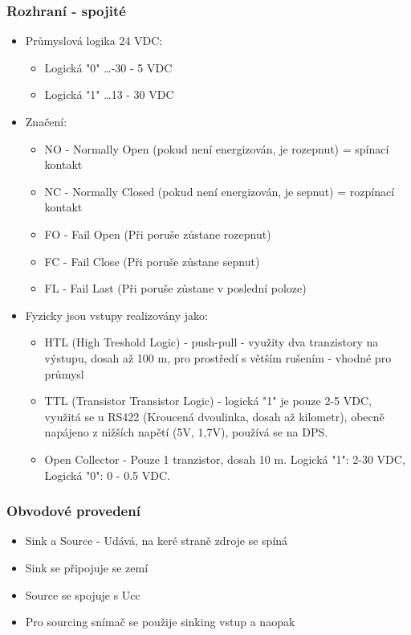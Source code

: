 \subsubsection*{Rozhraní - spojité}
\begin{itemize}
    \item Průmyslová logika 24 VDC: \begin{itemize}
              \item Logická "0" \dots -30 - 5 VDC
              \item Logická "1" \dots 13 - 30 VDC
          \end{itemize}
    \item Značení: \begin{itemize}
              \item NO - Normally Open (pokud není energizován, je rozepnut) = spínací kontakt
              \item NC - Normally Closed (pokud není energizován, je sepnut) = rozpínací kontakt
              \item FO - Fail Open (Při poruše zůstane rozepnut)
              \item FC - Fail Close (Při poruše zůstane sepnut)
              \item FL - Fail Last (Při poruše zůstane v poslední poloze)
          \end{itemize}
    \item Fyzicky jsou vstupy realizovány jako: \begin{itemize}
              \item HTL (High Treshold Logic) - push-pull - využity dva tranzistory na výstupu, dosah až 100 m, pro prostředí s větším rušením - vhodné pro průmysl
              \item TTL (Transistor Transistor Logic) - logická "1" je pouze 2-5 VDC, využitá se u RS422 (Kroucená dvoulinka, dosah až kilometr), obecně napájeno z nižších napětí (5V, 1,7V), používá se na DPS.
              \item Open Collector - Pouze 1 tranzistor, dosah 10 m. Logická "1": 2-30 VDC, Logická "0": 0 - 0.5 VDC.
          \end{itemize}
\end{itemize}

\subsubsection*{Obvodové provedení}
\begin{itemize}
    \item Sink a Source - Udává, na keré straně zdroje se spíná
    \item Sink se připojuje se zemí
    \item Source se spojuje s Ucc
    \item Pro sourcing snímač se použije sinking vstup a naopak
\end{itemize}

